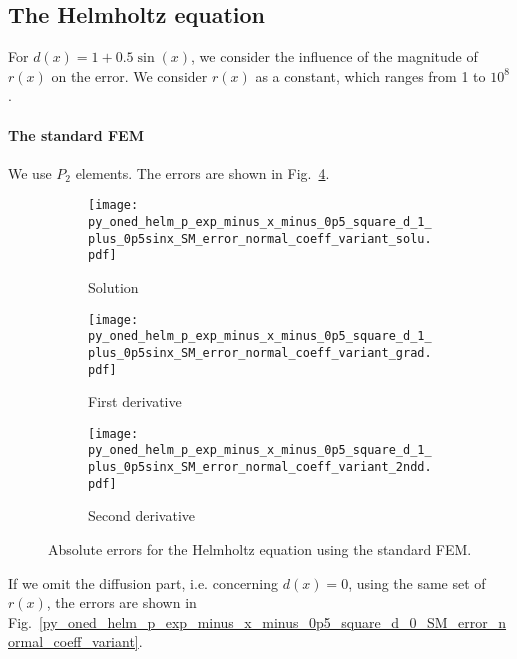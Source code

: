\documentclass[review,3p]{elsarticle}
\begin{document}
\newpage

\subsection{The Helmholtz equation}

For $d(x)=1+0.5 \sin(x)$, we consider the influence of the magnitude of $r(x)$ on the error.
We consider $r(x)$ as a constant, which ranges from 1 to $10^8$.

\paragraph{The standard FEM}
We use $P_2$ elements. The errors are shown in Fig.~\ref{py_oned_helm_p_exp_minus_x_minus_0p5_square_d_1_plus_0p5sinx_SM_error_normal_coeff_variant}.

\begin{figure}[!ht]
    \begin{subfigure}{5.5cm}
        \texttt{[image: py\_oned\_helm\_p\_exp\_minus\_x\_minus\_0p5\_square\_d\_1\_plus\_0p5sinx\_SM\_error\_normal\_coeff\_variant\_solu.pdf]}
        \caption{Solution}
        \label{py_oned_helm_p_exp_minus_x_minus_0p5_square_d_1_plus_0p5sinx_SM_error_normal_coeff_variant_solu}
    \end{subfigure}
    \hspace{-0.2cm}
    \begin{subfigure}{5.5cm}
        \texttt{[image: py\_oned\_helm\_p\_exp\_minus\_x\_minus\_0p5\_square\_d\_1\_plus\_0p5sinx\_SM\_error\_normal\_coeff\_variant\_grad.pdf]}
        \caption{First derivative}
        \label{py_oned_helm_p_exp_minus_x_minus_0p5_square_d_1_plus_0p5sinx_SM_error_normal_coeff_variant_grad}
    \end{subfigure}
    \hspace{-0.2cm}
    \begin{subfigure}{5.5cm}
        \texttt{[image: py\_oned\_helm\_p\_exp\_minus\_x\_minus\_0p5\_square\_d\_1\_plus\_0p5sinx\_SM\_error\_normal\_coeff\_variant\_2ndd.pdf]}
        \caption{Second derivative}
        \label{py_oned_helm_p_exp_minus_x_minus_0p5_square_d_1_plus_0p5sinx_SM_error_normal_coeff_variant_2ndd}
    \end{subfigure}
\caption{Absolute errors for the Helmholtz equation using the standard FEM.}
\label{py_oned_helm_p_exp_minus_x_minus_0p5_square_d_1_plus_0p5sinx_SM_error_normal_coeff_variant}
\end{figure}

If we omit the diffusion part, i.e. concerning $d(x)=0$, using the same set of $r(x)$, the errors are shown in Fig.~\ref{py_oned_helm_p_exp_minus_x_minus_0p5_square_d_0_SM_error_normal_coeff_variant}.
\end{document}
